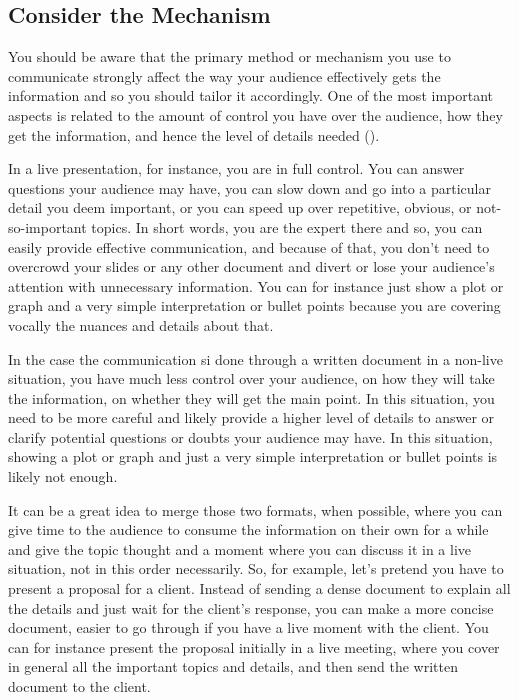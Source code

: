\documentclass[
]{krantz}
\begin{document}
\hypertarget{consider-the-mechanism}{%
\subsection{Consider the Mechanism}\label{consider-the-mechanism}}

You should be aware that the primary method or mechanism you use to communicate strongly affect the way your audience effectively gets the information and so you should tailor it accordingly. One of the most important aspects is related to the amount of control you have over the audience, how they get the information, and hence the level of details needed (\citet{Knaflic2015}).

In a live presentation, for instance, you are in full control. You can answer questions your audience may have, you can slow down and go into a particular detail you deem important, or you can speed up over repetitive, obvious, or not-so-important topics. In short words, you are the expert there and so, you can easily provide effective communication, and because of that, you don't need to overcrowd your slides or any other document and divert or lose your audience's attention with unnecessary information. You can for instance just show a plot or graph and a very simple interpretation or bullet points because you are covering vocally the nuances and details about that.

In the case the communication si done through a written document in a non-live situation, you have much less control over your audience, on how they will take the information, on whether they will get the main point. In this situation, you need to be more careful and likely provide a higher level of details to answer or clarify potential questions or doubts your audience may have. In this situation, showing a plot or graph and just a very simple interpretation or bullet points is likely not enough.

It can be a great idea to merge those two formats, when possible, where you can give time to the audience to consume the information on their own for a while and give the topic thought and a moment where you can discuss it in a live situation, not in this order necessarily. So, for example, let's pretend you have to present a proposal for a client. Instead of sending a dense document to explain all the details and just wait for the client's response, you can make a more concise document, easier to go through if you have a live moment with the client. You can for instance present the proposal initially in a live meeting, where you cover in general all the important topics and details, and then send the written document to the client.
\end{document}
